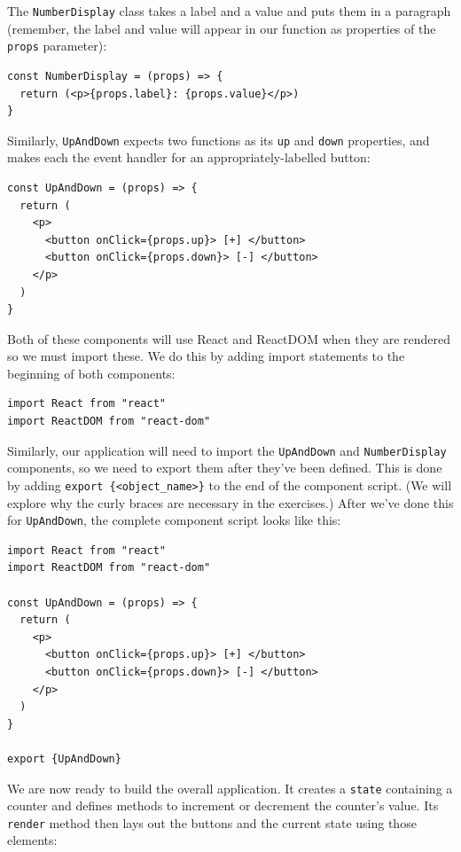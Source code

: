 The \texttt{NumberDisplay} class takes a label and a value and puts them
in a paragraph (remember, the label and value will appear in our
function as properties of the \texttt{props} parameter):

\begin{verbatim}
const NumberDisplay = (props) => {
  return (<p>{props.label}: {props.value}</p>)
}
\end{verbatim}

Similarly, \texttt{UpAndDown} expects two functions as its \texttt{up}
and \texttt{down} properties, and makes each the event handler for an
appropriately-labelled button:

\begin{verbatim}
const UpAndDown = (props) => {
  return (
    <p>
      <button onClick={props.up}> [+] </button>
      <button onClick={props.down}> [-] </button>
    </p>
  )
}
\end{verbatim}

Both of these components will use React and ReactDOM when they are
rendered so we must import these. We do this by adding import statements
to the beginning of both components:

\begin{verbatim}
import React from "react"
import ReactDOM from "react-dom"
\end{verbatim}

Similarly, our application will need to import the \texttt{UpAndDown}
and \texttt{NumberDisplay} components, so we need to export them after
they've been defined. This is done by adding
\texttt{export\ \{\textless{}object\_name\textgreater{}\}} to the end of
the component script. (We will explore why the curly braces are
necessary in the exercises.) After we've done this for
\texttt{UpAndDown}, the complete component script looks like this:

\begin{verbatim}
import React from "react"
import ReactDOM from "react-dom"

const UpAndDown = (props) => {
  return (
    <p>
      <button onClick={props.up}> [+] </button>
      <button onClick={props.down}> [-] </button>
    </p>
  )
}

export {UpAndDown}
\end{verbatim}

We are now ready to build the overall application. It creates a
\texttt{state} containing a counter and defines methods to increment or
decrement the counter's value. Its \texttt{render} method then lays out
the buttons and the current state using those elements:

